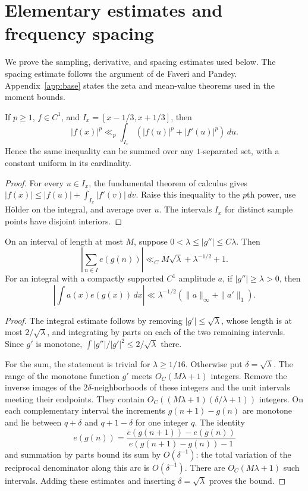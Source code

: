 \section{Elementary estimates and frequency spacing}\label{app:elementary}

We prove the sampling, derivative, and spacing estimates used below.
The spacing estimate follows the argument of de Faveri and Pandey.
Appendix~\ref{app:base} states the zeta and mean-value theorems used in
the moment bounds.

\begin{lemma}\label{lem:localproof}
If $p\ge1$, $f\in C^1$, and $I_x=[x-1/3,x+1/3]$, then
\[
 |f(x)|^p\ll_p\int_{I_x}(|f(u)|^p+|f'(u)|^p)\,du.
\]
Hence the same inequality can be summed over any $1$-separated set,
with a constant uniform in its cardinality.
\end{lemma}
\begin{proof}
For every $u\in I_x$, the fundamental theorem of calculus gives
$|f(x)|\le |f(u)|+\int_{I_x}|f'(v)|\,dv$. Raise this inequality to the
$p$th power, use H\"older on the integral, and average over $u$.
The intervals $I_x$ for distinct sample points have disjoint interiors.
\end{proof}

\begin{lemma}\label{lem:secondproof}
On an interval of length at most $M$, suppose
$0<\lambda\le |g''|\le C\lambda$. Then
\[
 \left|\sum_{n\in I}e(g(n))\right|
 \ll_C M\sqrt\lambda+\lambda^{-1/2}+1.
\]
For an integral with a compactly supported $C^1$ amplitude $a$, if
$|g''|\ge\lambda>0$, then
\[
 \left|\int a(x)e(g(x))\,dx\right|
 \ll\lambda^{-1/2}(\|a\|_\infty+\|a'\|_1).
\]
\end{lemma}
\begin{proof}
The integral estimate follows by removing $|g'|\le\sqrt\lambda$, whose
length is at most $2/\sqrt\lambda$, and integrating by parts on each of
the two remaining intervals. Since $g'$ is monotone,
$\int |g''|/|g'|^2\le2/\sqrt\lambda$ there.

For the sum, the statement is trivial for $\lambda\ge1/16$. Otherwise
put $\delta=\sqrt\lambda$. The range of the monotone function $g'$
meets $O_C(M\lambda+1)$ integers. Remove the inverse images of the
$2\delta$-neighborhoods of these integers and the unit intervals meeting
their endpoints. They contain
$O_C((M\lambda+1)(\delta/\lambda+1))$ integers. On each complementary
interval the increments $g(n+1)-g(n)$ are monotone and lie between
$q+\delta$ and $q+1-\delta$ for one integer $q$. The identity
\[
 e(g(n))=\frac{e(g(n+1))-e(g(n))}{e(g(n+1)-g(n))-1}
\]
and summation by parts bound its sum by $O(\delta^{-1})$: the total
variation of the reciprocal denominator along this arc is
$O(\delta^{-1})$. There are $O_C(M\lambda+1)$ such intervals.
Adding these estimates and inserting $\delta=\sqrt\lambda$ proves the bound.
\end{proof}

